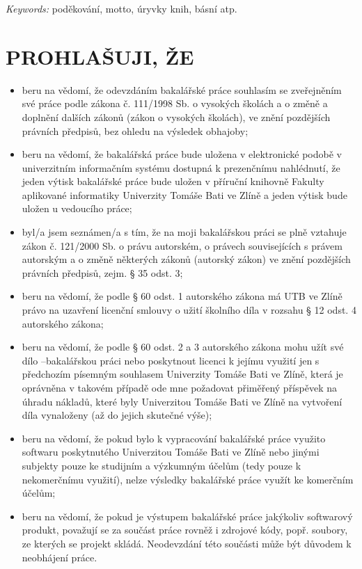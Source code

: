 \documentclass[a4paper,12pt]{article}
\def\nm#1{\clearpage\section*{\uppercase{#1}}}	%
\begin{document}
\emph{Keywords:}
\clearpage
\thispagestyle{empty}
poděkování, motto, úryvky knih, básní atp.
\clearpage
\thispagestyle{empty}
\nm{Prohlašuji, že}
\begin{itemize}
\item beru na vědomí, že odevzdáním bakalářské práce souhlasím se zveřejněním své práce podle zákona č. 111/1998 Sb. o vysokých školách a o změně a doplnění dalších zákonů (zákon o vysokých školách), ve znění pozdějších právních předpisů, bez ohledu na výsledek obhajoby;
\item beru na vědomí, že bakalářská práce bude uložena v elektronické podobě v univerzitním informačním systému dostupná k prezenčnímu nahlédnutí, že jeden výtisk bakalářské práce bude uložen v příruční knihovně Fakulty aplikované informatiky Univerzity Tomáše Bati ve Zlíně a jeden výtisk bude uložen u vedoucího práce; 
\item byl/a jsem seznámen/a s tím, že na moji bakalářskou práci se plně vztahuje zákon č. 121/2000 Sb. o právu autorském, o právech souvisejících s právem autorským a o změně některých zákonů (autorský zákon) ve znění pozdějších právních předpisů, zejm. § 35 odst. 3;
\item beru na vědomí, že podle § 60 odst. 1 autorského zákona má UTB ve Zlíně právo na uzavření licenční smlouvy o užití školního díla v rozsahu § 12 odst. 4 autorského zákona;
\item beru na vědomí, že podle § 60 odst. 2 a 3 autorského zákona mohu užít své dílo –bakalářskou práci nebo poskytnout licenci k jejímu využití jen s předchozím písemným souhlasem Univerzity Tomáše Bati ve Zlíně, která je oprávněna v takovém případě ode mne požadovat přiměřený příspěvek na úhradu nákladů, které byly Univerzitou Tomáše Bati ve Zlíně na vytvoření díla vynaloženy (až do jejich skutečné výše);
\item beru na vědomí, že pokud bylo k vypracování bakalářské práce
využito softwaru poskytnutého Univerzitou Tomáše Bati ve Zlíně nebo jinými
subjekty pouze ke studijním a výzkumným účelům (tedy pouze k nekomerčnímu
využití), nelze výsledky bakalářské práce využít ke komerčním
účelům;
\item beru na vědomí, že pokud je výstupem bakalářské práce jakýkoliv softwarový produkt, považují se za součást práce rovněž i zdrojové kódy, popř. soubory, ze kterých se projekt skládá. Neodevzdání této součásti může být důvodem k neobhájení práce.
\end{itemize}
\end{document}
